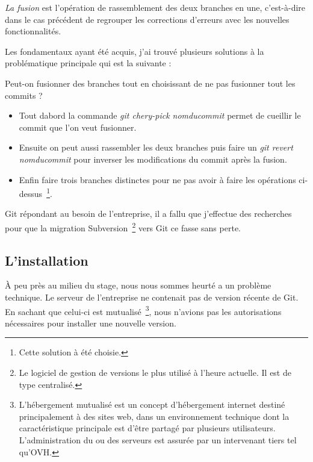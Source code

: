 \emph{La fusion} est l'opération de rassemblement des deux branches en une,
c'est-à-dire dans le cas précédent de regrouper les corrections d'erreurs avec
les nouvelles fonctionnalités.

Les fondamentaux ayant été acquis, j'ai trouvé plusieurs solutions à la
problématique principale qui est la suivante : \newline

Peut-on fusionner des branches tout en choisissant de ne pas fusionner
tout les commits ? \newline

\begin{itemize}
    \item Tout dabord la commande \emph{git chery-pick \og nomducommit \fg{}}
        permet de \og cueillir \fg{} le commit que l'on veut fusionner.
    \item Ensuite on peut aussi rassembler les deux branches puis faire un
        \emph{git revert \og nomducommit \fg{}} pour inverser les modifications
        du commit après la fusion.
    \item Enfin faire trois branches distinctes pour ne pas avoir à faire les
        opérations ci-dessus\, \footnote{Cette solution à été choisie.}.
\end{itemize}

Git répondant au besoin de l'entreprise, il a fallu que j'effectue des
recherches pour que la migration Subversion\, \footnote{Le logiciel de gestion
de versions le plus utilisé à l'heure actuelle. Il est de type centralisé.}
vers Git ce fasse sans perte.

\subsection{L'installation} %

À peu près au milieu du stage, nous nous sommes heurté a un problème technique.
Le serveur de l'entreprise ne contenait pas de version récente de Git. En
sachant que celui-ci est mutualisé\, \footnote{L'hébergement mutualisé est un
concept d'hébergement internet destiné principalement à des sites web, dans un
environnement technique dont la caractéristique principale est d'être partagé
par plusieurs utilisateurs. L'administration du ou des serveurs est assurée par
un intervenant tiers tel qu'OVH.}, nous n'avions pas les autorisations
nécessaires pour installer une nouvelle version.

